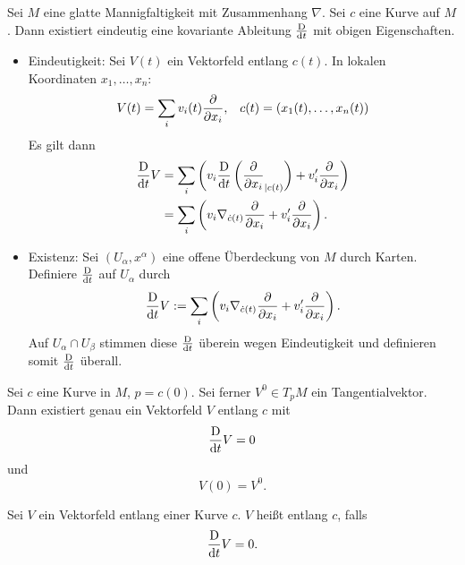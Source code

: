 \Prop{}
Sei $M$ eine glatte Mannigfaltigkeit mit Zusammenhang $\nabla$. Sei $c$ eine Kurve auf $M$. Dann existiert eindeutig eine kovariante Ableitung $\frac{\text{D}}{\text{d} t}$ mit obigen Eigenschaften.
\begin{Beweis}{}
\begin{itemize}
	\item Eindeutigkeit: Sei $V(t)$ ein Vektorfeld entlang $c(t)$. In lokalen Koordinaten $x_1, \ldots, x_n$:
	\begin{align*}
	V(t) = \sum_i v_i(t) \frac{\partial }{\partial x_i}, && c(t) = (x_1(t), \ldots, x_n(t))
	\end{align*}
	Es gilt dann
	\begin{align*}
	\frac{\text{D}}{\text{d} t} V &= \sum_i \left(
v_i \frac{\text{D}}{\text{d} t} \left(
\frac{\partial }{\partial x_i}_{|c(t)}
\right)	+ v_i' \frac{\partial }{\partial x_i}
\right)\\
&= \sum_i \left(
v_i \nabla_{\dot{c}(t)} \frac{\partial }{\partial x_i} 
+ v_i'\frac{\partial }{\partial x_i}
\right).
	\end{align*}
	
	\item Existenz: Sei $(U_\alpha, x^\alpha)$ eine offene Überdeckung von $M$ durch Karten. Definiere $\frac{\text{D}}{\text{d} t}$ auf $U_\alpha$ durch
	\begin{align*}
	\frac{\text{D}}{\text{d} t} V := \sum_i \left(
		v_i \nabla_{\dot{c}(t)} \frac{\partial }{\partial x_i} 
		+ v_i'\frac{\partial }{\partial x_i}
	\right).
	\end{align*}
	Auf $U_\alpha \cap U_\beta$ stimmen diese $\frac{\text{D}}{\text{d} t}$ überein wegen Eindeutigkeit und definieren somit $\frac{\text{D}}{\text{d} t}$ überall.
\end{itemize}
\end{Beweis}

\Prop{}
Sei $c$ eine Kurve in $M$, $p = c(0)$. Sei ferner $V^0 \in T_pM$ ein Tangentialvektor. Dann existiert genau ein Vektorfeld $V$ entlang $c$ mit
\[ \frac{\text{D}}{\text{d} t}V = 0 \]
und
\[ V(0) = V^0. \]

\Def{}
Sei $V$ ein Vektorfeld entlang einer Kurve $c$. $V$ heißt  entlang $c$, falls
\[ \frac{\text{D}}{\text{d} t}V =0. \]

